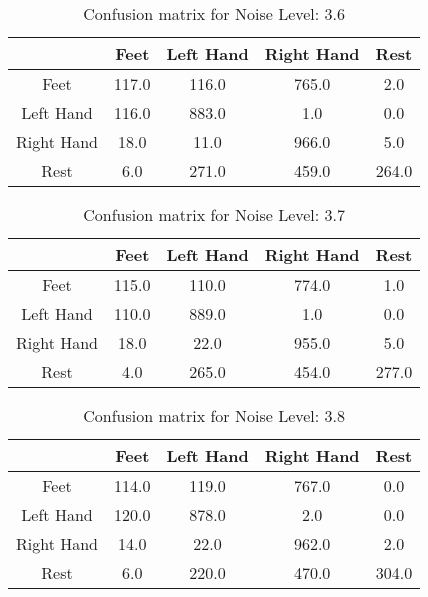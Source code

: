 \begin{table}[!htbp]
    \centering
    \begin{tabular}{|c||c|c|c|c|}
        \hline
		 & Feet & Left Hand & Right Hand & Rest \\
        \hline
        \hline
        Feet & 117.0 & 116.0 & 765.0 & 2.0 \\
        \hline
        Left Hand & 116.0 & 883.0 & 1.0 & 0.0 \\
        \hline
        Right Hand & 18.0 & 11.0 & 966.0 & 5.0 \\
        \hline
        Rest & 6.0 & 271.0 & 459.0 & 264.0 \\
        \hline
    \end{tabular}
    \caption{Confusion matrix for Noise Level: 3.6}
\end{table}

\begin{table}[!htbp]
    \centering
    \begin{tabular}{|c||c|c|c|c|}
        \hline
		 & Feet & Left Hand & Right Hand & Rest \\
        \hline
        \hline
        Feet & 115.0 & 110.0 & 774.0 & 1.0 \\
        \hline
        Left Hand & 110.0 & 889.0 & 1.0 & 0.0 \\
        \hline
        Right Hand & 18.0 & 22.0 & 955.0 & 5.0 \\
        \hline
        Rest & 4.0 & 265.0 & 454.0 & 277.0 \\
        \hline
    \end{tabular}
    \caption{Confusion matrix for Noise Level: 3.7}
\end{table}

\begin{table}[!htbp]
    \centering
    \begin{tabular}{|c||c|c|c|c|}
        \hline
		 & Feet & Left Hand & Right Hand & Rest \\
        \hline
        \hline
        Feet & 114.0 & 119.0 & 767.0 & 0.0 \\
        \hline
        Left Hand & 120.0 & 878.0 & 2.0 & 0.0 \\
        \hline
        Right Hand & 14.0 & 22.0 & 962.0 & 2.0 \\
        \hline
        Rest & 6.0 & 220.0 & 470.0 & 304.0 \\
        \hline
    \end{tabular}
    \caption{Confusion matrix for Noise Level: 3.8}
\end{table}

